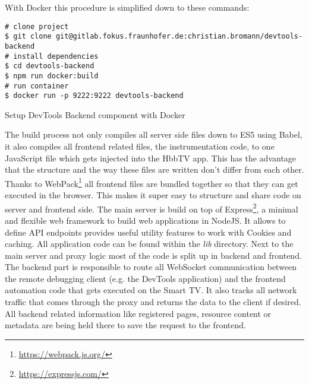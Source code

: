 With Docker this procedure is simplified down to these commands:

\vspace{1cm}
\begin{listing}[H]
\begin{verbatim}
# clone project
$ git clone git@gitlab.fokus.fraunhofer.de:christian.bromann/devtools-backend
# install dependencies
$ cd devtools-backend
$ npm run docker:build
# run container
$ docker run -p 9222:9222 devtools-backend
\end{verbatim}
\caption{Setup DevTools Backend component with Docker}
\label{lst:setupdevtools}
\end{listing}
\vspace{0.5cm}

The build process not only compiles all server side files down to ES5 using Babel, it also compiles
all frontend related files, the instrumentation code, to one JavaScript file which gets injected
into the HbbTV app. This has the advantage that the structure and the way these files are written
don't differ from each other. Thanks to WebPack\footnote{\url{https://webpack.js.org/}} all frontend
files are bundled together so that they can get executed in the browser. This makes it super easy
to structure and share code on server and frontend side. The main server is build on top of Express\footnote{\url{https://expressjs.com/}},
a minimal and flexible web framework to build web applications in NodeJS. It allows to define API
endpoints provides useful utility features to work with Cookies and caching. All application code
can be found within the \textit{lib} directory. Next to the main server and proxy logic most of the
code is split up in backend and frontend. The backend part is responsible to route all WebSocket
communication between the remote debugging client (e.g. the DevTools application) and the frontend
automation code that gets executed on the Smart TV. It also tracks all network traffic that comes
through the proxy and returns the data to the client if desired. All backend related information
like registered pages, resource content or metadata are being held there to save the request to the
frontend.

